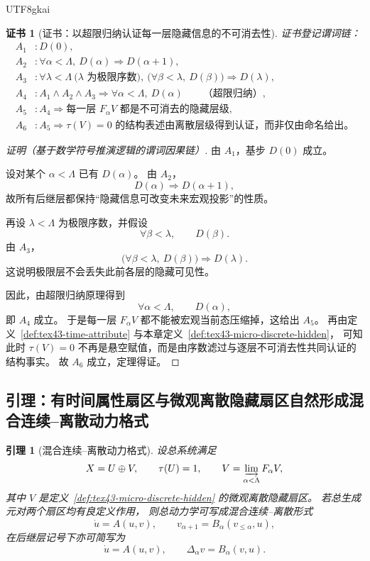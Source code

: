 \documentclass[12pt]{article}
\newtheorem{lemma}{引理}[section]
\newtheorem{Certificate}{证书}[section]
\begin{document}
\begin{CJK*}{UTF8}{gkai}
\begin{Certificate}[证书：以超限归纳认证每一层隐藏信息的不可消去性]
\label{cert:tex43-discrete-hidden-induction}
证书登记谓词链：
\[
\begin{aligned}
  A_1 &: D(0),\\
  A_2 &: \forall \alpha<\Lambda,\ D(\alpha)\Rightarrow D(\alpha+1),\\
  A_3 &: \forall \lambda<\Lambda\ \big(\lambda\text{ 为极限序数}\big),\
         \Big(\forall \beta<\lambda,\ D(\beta)\Big)\Rightarrow D(\lambda),\\
  A_4 &: A_1\wedge A_2\wedge A_3 \Rightarrow
         \forall \alpha<\Lambda,\ D(\alpha)\qquad\text{（超限归纳）},\\
  A_5 &: A_4 \Rightarrow
         \text{每一层 }F_\alpha V\text{ 都是不可消去的隐藏层级},\\
  A_6 &: A_5 \Rightarrow
         \tau(V)=0\text{ 的结构表述由离散层级得到认证，而非仅由命名给出。}
\end{aligned}
\]
\end{Certificate}

\begin{proof}[证明（基于数学符号推演逻辑的谓词因果链）]
由 $A_1$，基步 $D(0)$ 成立。

设对某个 $\alpha<\Lambda$ 已有 $D(\alpha)$。
由 $A_2$，
\[
  D(\alpha)\Rightarrow D(\alpha+1),
\]
故所有后继层都保持“隐藏信息可改变未来宏观投影”的性质。

再设 $\lambda<\Lambda$ 为极限序数，并假设
\[
  \forall \beta<\lambda,\qquad D(\beta).
\]
由 $A_3$，
\[
  \Big(\forall \beta<\lambda,\ D(\beta)\Big)\Rightarrow D(\lambda).
\]
这说明极限层不会丢失此前各层的隐藏可见性。

因此，由超限归纳原理得到
\[
  \forall \alpha<\Lambda,\qquad D(\alpha),
\]
即 $A_4$ 成立。
于是每一层 $F_\alpha V$ 都不能被宏观当前态压缩掉，这给出 $A_5$。
再由定义~\ref{def:tex43-time-attribute} 与本章定义~\ref{def:tex43-micro-discrete-hidden}，
可知此时 $\tau(V)=0$ 不再是悬空赋值，而是由序数滤过与逐层不可消去性共同认证的结构事实。
故 $A_6$ 成立，定理得证。
\end{proof}

\subsection{引理：有时间属性扇区与微观离散隐藏扇区自然形成混合连续--离散动力格式}
\label{subsec:tex43-ch5-lemma}

\begin{lemma}[混合连续--离散动力格式]
\label{lem:tex43-hybrid-dynamics}
设总系统满足
\[
  X=U\oplus V,
  \qquad
  \tau(U)=1,
  \qquad
  V=\varinjlim_{\alpha<\Lambda}F_\alpha V,
\]
其中 $V$ 是定义~\ref{def:tex43-micro-discrete-hidden} 的微观离散隐藏扇区。
若总生成元对两个扇区均有良定义作用，
则总动力学可写成混合连续--离散形式
\[
  \dot u = A(u,v),
  \qquad
  v_{\alpha+1}=B_\alpha(v_{\le \alpha},u),
\]
在后继层记号下亦可简写为
\[
  \dot u = A(u,v),
  \qquad
  \Delta_\alpha v = B_\alpha(v,u).
\]
\end{lemma}


\end{CJK*}
\end{document}
